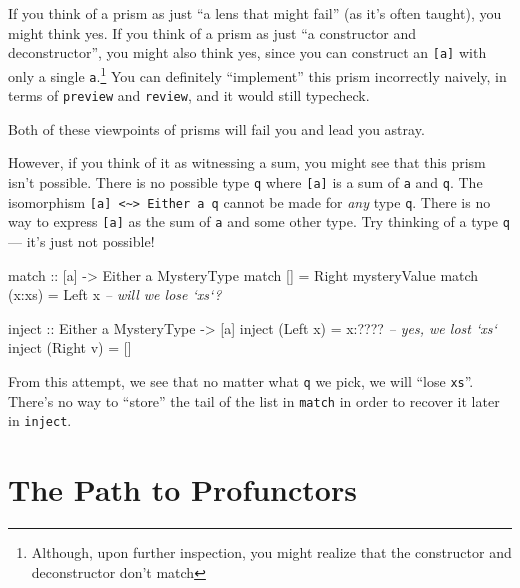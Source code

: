 \documentclass[]{article}
\newenvironment{Shaded}{}{}
\newcommand{\CommentTok}[1]{\textcolor[rgb]{0.38,0.63,0.69}{\textit{#1}}}
\newcommand{\DataTypeTok}[1]{\textcolor[rgb]{0.56,0.13,0.00}{#1}}
\newcommand{\FunctionTok}[1]{\textcolor[rgb]{0.02,0.16,0.49}{#1}}
\newcommand{\NormalTok}[1]{#1}
\newcommand{\OtherTok}[1]{\textcolor[rgb]{0.00,0.44,0.13}{#1}}
\begin{document}
If you think of a prism as just ``a lens that might fail'' (as it's often
taught), you might think yes. If you think of a prism as just ``a constructor
and deconstructor'', you might also think yes, since you can construct an
\texttt{{[}a{]}} with only a single \texttt{a}.\footnote{Although, upon further
  inspection, you might realize that the constructor and deconstructor don't
  match} You can definitely ``implement'' this prism incorrectly naively, in
terms of \texttt{preview} and \texttt{review}, and it would still typecheck.

Both of these viewpoints of prisms will fail you and lead you astray.

However, if you think of it as witnessing a sum, you might see that this prism
isn't possible. There is no possible type \texttt{q} where \texttt{{[}a{]}} is a
sum of \texttt{a} and \texttt{q}. The isomorphism
\texttt{{[}a{]}\ \textless{}\textasciitilde{}\textgreater{}\ Either\ a\ q}
cannot be made for \emph{any} type \texttt{q}. There is no way to express
\texttt{{[}a{]}} as the sum of \texttt{a} and some other type. Try thinking of a
type \texttt{q} --- it's just not possible!

\begin{Shaded}
\begin{Highlighting}[]
\OtherTok{match ::}\NormalTok{ [a] }\OtherTok{->} \DataTypeTok{Either}\NormalTok{ a }\DataTypeTok{MysteryType}
\NormalTok{match []     }\FunctionTok{=} \DataTypeTok{Right}\NormalTok{ mysteryValue}
\NormalTok{match (x}\FunctionTok{:}\NormalTok{xs) }\FunctionTok{=} \DataTypeTok{Left}\NormalTok{ x                       }\CommentTok{-- will we lose `xs`?}

\OtherTok{inject ::} \DataTypeTok{Either}\NormalTok{ a }\DataTypeTok{MysteryType} \OtherTok{->}\NormalTok{ [a]}
\NormalTok{inject (}\DataTypeTok{Left}\NormalTok{ x)  }\FunctionTok{=}\NormalTok{ x}\FunctionTok{:????}                   \CommentTok{-- yes, we lost `xs`}
\NormalTok{inject (}\DataTypeTok{Right}\NormalTok{ v) }\FunctionTok{=}\NormalTok{ []}
\end{Highlighting}
\end{Shaded}

From this attempt, we see that no matter what \texttt{q} we pick, we will ``lose
\texttt{xs}''. There's no way to ``store'' the tail of the list in
\texttt{match} in order to recover it later in \texttt{inject}.

\hypertarget{the-path-to-profunctors}{%
\section{The Path to Profunctors}\label{the-path-to-profunctors}}
\end{document}
